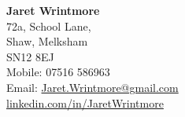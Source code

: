 \documentclass[a4paper,9pt]{extarticle}
\author{Jaret Wrintmore}
\begin{document}
\pagestyle{empty}

\begin{center}
\textbf{\Large Jaret Wrintmore}\\[2pt] %

\vspace{3mm}72a, School Lane,\\Shaw, Melksham\\ SN12 8EJ \\\vspace{1mm} Mobile: 07516 586963 \\\vspace{1mm} Email: \href{mailto:jaret.wrintmore@gmail.com}{Jaret.Wrintmore@gmail.com} \\\vspace{1mm}\href{https://www.linkedin.com/in/JaretWrintmore}{linkedin.com/in/JaretWrintmore} %
\end{center}








\end{document}

